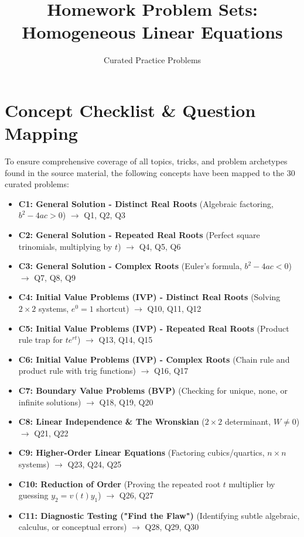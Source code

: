 \documentclass[11pt]{article}
\title{Homework Problem Sets: Homogeneous Linear Equations}
\author{Curated Practice Problems}
\date{}
\begin{document}
\maketitle
\tableofcontents
\newpage

\section{Concept Checklist \& Question Mapping}
To ensure comprehensive coverage of all topics, tricks, and problem archetypes found in the source material, the following concepts have been mapped to the 30 curated problems:

\begin{itemize}
    \item \textbf{C1: General Solution - Distinct Real Roots} (Algebraic factoring, $b^2-4ac > 0$) $\rightarrow$ Q1, Q2, Q3
    \item \textbf{C2: General Solution - Repeated Real Roots} (Perfect square trinomials, multiplying by $t$) $\rightarrow$ Q4, Q5, Q6
    \item \textbf{C3: General Solution - Complex Roots} (Euler's formula, $b^2-4ac < 0$) $\rightarrow$ Q7, Q8, Q9
    \item \textbf{C4: Initial Value Problems (IVP) - Distinct Real Roots} (Solving $2 \times 2$ systems, $e^0=1$ shortcut) $\rightarrow$ Q10, Q11, Q12
    \item \textbf{C5: Initial Value Problems (IVP) - Repeated Real Roots} (Product rule trap for $te^{rt}$) $\rightarrow$ Q13, Q14, Q15
    \item \textbf{C6: Initial Value Problems (IVP) - Complex Roots} (Chain rule and product rule with trig functions) $\rightarrow$ Q16, Q17
    \item \textbf{C7: Boundary Value Problems (BVP)} (Checking for unique, none, or infinite solutions) $\rightarrow$ Q18, Q19, Q20
    \item \textbf{C8: Linear Independence \& The Wronskian} ($2 \times 2$ determinant, $W \neq 0$) $\rightarrow$ Q21, Q22
    \item \textbf{C9: Higher-Order Linear Equations} (Factoring cubics/quartics, $n \times n$ systems) $\rightarrow$ Q23, Q24, Q25
    \item \textbf{C10: Reduction of Order} (Proving the repeated root $t$ multiplier by guessing $y_2 = v(t)y_1$) $\rightarrow$ Q26, Q27
    \item \textbf{C11: Diagnostic Testing ("Find the Flaw")} (Identifying subtle algebraic, calculus, or conceptual errors) $\rightarrow$ Q28, Q29, Q30
\end{itemize}
\end{document}
